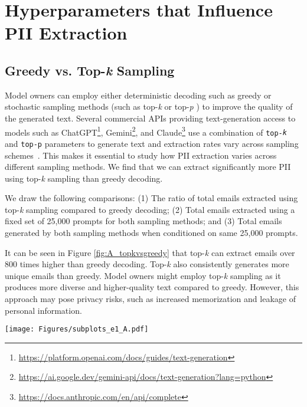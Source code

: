 
\section{Hyperparameters that Influence PII Extraction}
\subsection{Greedy vs. Top-\textit{k} Sampling}
\label{section:greedyvstopk}

Model owners can employ either deterministic decoding such as greedy or stochastic sampling methods (such as top-\textit{k} \cite{fan-etal-2018-hierarchical} or top-\textit{p} \cite{top-p}) to improve the quality of the generated text. Several commercial APIs providing text-generation access to models such as ChatGPT\footnote{\url{https://platform.openai.com/docs/guides/text-generation}}, Gemini\footnote{\url{https://ai.google.dev/gemini-api/docs/text-generation?lang=python}}, and Claude\footnote{\url{https://docs.anthropic.com/en/api/complete}} use a combination of \texttt{top-\textit{k}} and \texttt{top-p} parameters to generate text and extraction rates vary across sampling schemes~\citep{hayes2024measuringmemorizationprobabilisticdiscoverable}. This makes it essential to study how PII extraction varies across different sampling methods. We find that we can extract significantly more PII using top-\textit{k} sampling than greedy decoding.  

We draw the following comparisons: (1) The ratio of total emails extracted using top-\emph{k} sampling compared to greedy decoding; (2) Total emails extracted using a fixed set of 25,000 prompts for both sampling methods; and (3) Total emails generated by both sampling methods when conditioned on same 25,000 prompts. 


It can be seen in Figure \ref{fig:A_topkvsgreedy} that top-\textit{k} can extract emails over 800 times higher than greedy decoding. Top-\textit{k} also consistently generates more unique emails than greedy. Model owners might employ top-\textit{k} sampling as it produces more diverse and higher-quality text compared to greedy. However, this approach may pose privacy risks, such as increased memorization and leakage of personal information. 


\begin{figure*}[t]
  \texttt{[image: Figures/subplots\_e1\_A.pdf]}  
  \caption {(Left) We can extract significantly more emails with top-\emph{k} than with greedy decoding using the same set of prompts. (Middle) We can extract up to 800 times more emails using top-\emph{k}. (Right) top-\emph{k} generates more emails than greedy for the same amount of emails seen during training. The x-axis denotes a separate model obtained after adding an additional 10\% of total emails in the training data.}
  \label{fig:A_topkvsgreedy}
\end{figure*}






